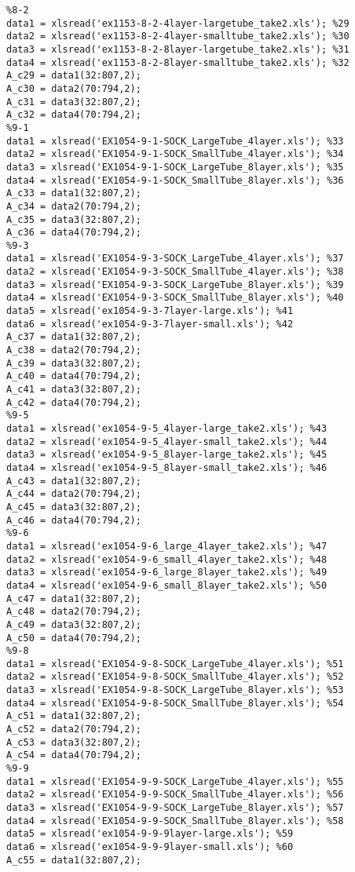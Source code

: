 \begin{verbatim}
%8-2
data1 = xlsread('ex1153-8-2-4layer-largetube_take2.xls'); %29
data2 = xlsread('ex1153-8-2-4layer-smalltube_take2.xls'); %30
data3 = xlsread('ex1153-8-2-8layer-largetube_take2.xls'); %31
data4 = xlsread('ex1153-8-2-8layer-smalltube_take2.xls'); %32
A_c29 = data1(32:807,2);
A_c30 = data2(70:794,2);
A_c31 = data3(32:807,2);
A_c32 = data4(70:794,2);
%9-1
data1 = xlsread('EX1054-9-1-SOCK_LargeTube_4layer.xls'); %33
data2 = xlsread('EX1054-9-1-SOCK_SmallTube_4layer.xls'); %34
data3 = xlsread('EX1054-9-1-SOCK_LargeTube_8layer.xls'); %35
data4 = xlsread('EX1054-9-1-SOCK_SmallTube_8layer.xls'); %36
A_c33 = data1(32:807,2);
A_c34 = data2(70:794,2);
A_c35 = data3(32:807,2);
A_c36 = data4(70:794,2);
%9-3
data1 = xlsread('EX1054-9-3-SOCK_LargeTube_4layer.xls'); %37
data2 = xlsread('EX1054-9-3-SOCK_SmallTube_4layer.xls'); %38
data3 = xlsread('EX1054-9-3-SOCK_LargeTube_8layer.xls'); %39
data4 = xlsread('EX1054-9-3-SOCK_SmallTube_8layer.xls'); %40
data5 = xlsread('ex1054-9-3-7layer-large.xls'); %41
data6 = xlsread('ex1054-9-3-7layer-small.xls'); %42
A_c37 = data1(32:807,2);
A_c38 = data2(70:794,2);
A_c39 = data3(32:807,2);
A_c40 = data4(70:794,2);
A_c41 = data3(32:807,2);
A_c42 = data4(70:794,2);
%9-5
data1 = xlsread('ex1054-9-5_4layer-large_take2.xls'); %43
data2 = xlsread('ex1054-9-5_4layer-small_take2.xls'); %44
data3 = xlsread('ex1054-9-5_8layer-large_take2.xls'); %45
data4 = xlsread('ex1054-9-5_8layer-small_take2.xls'); %46
A_c43 = data1(32:807,2);
A_c44 = data2(70:794,2);
A_c45 = data3(32:807,2);
A_c46 = data4(70:794,2);
%9-6
data1 = xlsread('ex1054-9-6_large_4layer_take2.xls'); %47
data2 = xlsread('ex1054-9-6_small_4layer_take2.xls'); %48
data3 = xlsread('ex1054-9-6_large_8layer_take2.xls'); %49
data4 = xlsread('ex1054-9-6_small_8layer_take2.xls'); %50
A_c47 = data1(32:807,2);
A_c48 = data2(70:794,2);
A_c49 = data3(32:807,2);
A_c50 = data4(70:794,2);
%9-8
data1 = xlsread('EX1054-9-8-SOCK_LargeTube_4layer.xls'); %51
data2 = xlsread('EX1054-9-8-SOCK_SmallTube_4layer.xls'); %52
data3 = xlsread('EX1054-9-8-SOCK_LargeTube_8layer.xls'); %53
data4 = xlsread('EX1054-9-8-SOCK_SmallTube_8layer.xls'); %54
A_c51 = data1(32:807,2);
A_c52 = data2(70:794,2);
A_c53 = data3(32:807,2);
A_c54 = data4(70:794,2);
%9-9
data1 = xlsread('EX1054-9-9-SOCK_LargeTube_4layer.xls'); %55
data2 = xlsread('EX1054-9-9-SOCK_SmallTube_4layer.xls'); %56
data3 = xlsread('EX1054-9-9-SOCK_LargeTube_8layer.xls'); %57
data4 = xlsread('EX1054-9-9-SOCK_SmallTube_8layer.xls'); %58
data5 = xlsread('ex1054-9-9-9layer-large.xls'); %59
data6 = xlsread('ex1054-9-9-9layer-small.xls'); %60
A_c55 = data1(32:807,2);

\end{verbatim}
